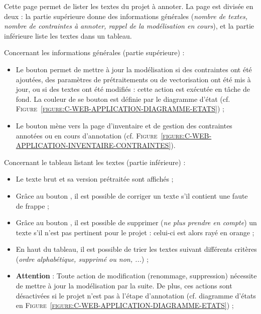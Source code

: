 			Cette page permet de lister les textes du projet à annoter.
			La page est divisée en deux : la partie supérieure donne des informations générales (\textit{nombre de textes, nombre de contraintes à annoter, rappel de la modélisation en cours}), et la partie inférieure liste les textes dans un tableau.
			
			Concernant les informations générales (partie supérieure) :
			\begin{itemize}
				\item Le bouton  permet de mettre à jour la modélisation si des contraintes ont été ajoutées, des paramètres de prétraitements ou de vectorisation ont été mis à jour, ou si des textes ont été modifiés : cette action est exécutée en tâche de fond.
				La couleur de se bouton est définie par le diagramme d'état (cf. \textsc{Figure~\ref{figure:C-WEB-APPLICATION-DIAGRAMME-ETATS}}) ;
				\item Le bouton  mène vers la page d'inventaire et de gestion des contraintes annotées ou en cours d'annotation (cf. \textsc{Figure~\ref{figure:C-WEB-APPLICATION-INVENTAIRE-CONTRAINTES}}).
			\end{itemize}
			
			Concernant le tableau listant les textes (partie inférieure) :
			\begin{itemize}
				\item Le texte brut et sa version prétraitée sont affichés ;
				\item Grâce au bouton \textguillemets{\faPen}, il est possible de corriger un texte s'il contient une faute de frappe ;
				\item Grâce au bouton \textguillemets{\textcolor{colorApplicationDELETE}{\faTrash}}, il est possible de supprimer (\textit{ne plus prendre en compte}) un texte s'il n'est pas pertinent pour le projet : celui-ci est alors rayé en \textcolor{colorApplicationDELETE}{orange} ;
				\item En haut du tableau, il est possible de trier les textes suivant différents critères (\textit{ordre alphabétique, supprimé ou non, ...}) ;
				\item \textbf{Attention} : Toute action de modification (renommage, suppression) nécessite de mettre à jour la modélisation par la suite.
				De plus, ces actions sont désactivées si le projet n'est pas à l'étape d'annotation (cf. diagramme d'états en \textsc{Figure~\ref{figure:C-WEB-APPLICATION-DIAGRAMME-ETATS}}) ;
			\end{itemize}
		
